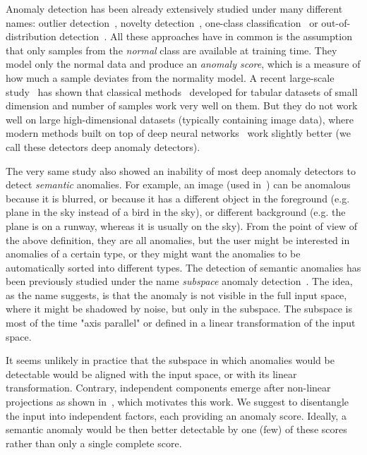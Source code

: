 Anomaly detection has been already extensively studied under many different names: outlier detection~\cite{knorr98algorithms,hodge2004survey}, novelty detection~\cite{pimentel2014review}, one-class classification~\cite{ruff2018deep} or out-of-distribution detection~\cite{liang2017enhancing}. All these approaches have in common is the assumption that only samples from the \textit{normal} class are available at training time. They model only the normal data and produce an \textit{anomaly score}, which is a measure of how much a sample deviates from the normality model. A recent large-scale study~\cite{vskvara2021comparison} has shown that classical methods~\cite{knorr98algorithms, scholkopf2001estimating, liu2008isolation, pevny2016loda} developed for tabular datasets of small dimension and number of samples work very well on them. But they do not work well on large high-dimensional datasets (typically containing image data), where modern methods built on top of deep neural networks~\cite{akcay2018ganomaly, perera2019ocgan, ruff2019deep, zavrtanik2021draem} work slightly better (we call these detectors deep anomaly detectors). 

The very same study also showed an inability of most deep anomaly detectors to detect \textit{semantic} anomalies. For example, an image (used in~\cite{vskvara2021comparison}) can be anomalous because it is blurred, or because it has a different object in the foreground (e.g. plane in the sky instead of a bird in the sky), or different background (e.g. the plane is on a runway, whereas it is usually on the sky). From the point of view of the above definition, they are all anomalies, but the user might be interested in anomalies of a certain type, or they might want the anomalies to be automatically sorted into different types. The detection of semantic anomalies has been previously studied under the name \emph{subspace} anomaly detection~\cite{raz2002semantic, kriegel2009outlier,rahmani2016randomized}. The idea, as the name suggests, is that the anomaly is not visible in the full input space, where it might be shadowed by noise, but only in the subspace. The subspace is most of the time "axis parallel" or defined in a linear transformation of the input space. 

It seems unlikely in practice that the subspace in which anomalies would be detectable would be aligned with the input space, or with its linear transformation. Contrary, independent components emerge after non-linear projections as shown in~\cite{burgess2018understanding, kim2018disentangling, esmaeili2019structuredhfvae, tschannen2018recent, bai2021contrastively, kim2019bayes, deecke2021transfer}, which motivates this work. We suggest to disentangle the input into independent factors, each providing an anomaly score. Ideally, a semantic anomaly would be then better detectable by one (few) of these scores rather than only a single complete score. 

